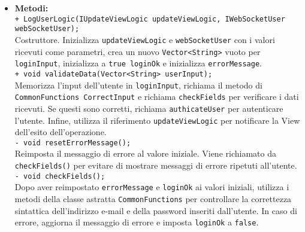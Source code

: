 {{\begin{sloppypar}
{{{\begin{itemize}
					\texttt{- String errorMessage} messaggio di errore da ritornare all'utente in caso di problemi nel login;\\

					\texttt{- IWebSocketUser webSocketUser}: riferimento alla classe \texttt{WebSocketUser}. Permette di richiamare i metodi per l'autenticazione e la terminazione della sessione utente;\\

					\texttt{- IUpdateViewLogic updateViewLogic}: riferimento alla classe \texttt{UpdateViewLogic}. Permette di richiamare i metodi di aggiornamento della View.\\
			
				\item[] \textbf{Metodi:}\\
					\texttt{+ LogUserLogic(IUpdateViewLogic updateViewLogic, IWebSocketUser webSocketUser);}\\
					Costruttore. Inizializza \texttt{updateViewLogic} e \texttt{webSocketUser} con i valori ricevuti come parametri, crea un nuovo \texttt{Vector<String>} vuoto per \texttt{loginInput}, inizializza a \texttt{true loginOk} e inizializza \texttt{errorMessage}.\\
				
					\texttt{+ void validateData(Vector<String> userInput);}\\
					Memorizza l'input dell'utente in \texttt{loginInput}, richiama il metodo di \texttt{CommonFunctions CorrectInput} e richiama \texttt{checkFields} per verificare i dati ricevuti. Se questi sono corretti, richiama \texttt{authicateUser} per autenticare l'utente. Infine, utilizza il riferimento \texttt{updateViewLogic} per notificare la View dell'esito dell'operazione.\\

					\texttt{- void resetErrorMessage();}\\
					Reimposta il messaggio di errore al valore iniziale. Viene richiamato da \texttt{checkFields()} per evitare di mostrare messaggi di errore ripetuti all'utente.\\

					\texttt{- void checkFields();}\\
					Dopo aver reimpostato \texttt{errorMessage} e \texttt{loginOk} ai valori iniziali, utilizza i metodi della classe astratta \texttt{CommonFunctions} per controllare la correttezza sintattica dell'indirizzo e-mail e della password inseriti dall'utente. In caso di errore, aggiorna il messaggio di errore e imposta \texttt{loginOk} a \texttt{false}.\\


\end{itemize}}}}
\end{sloppypar}}}
